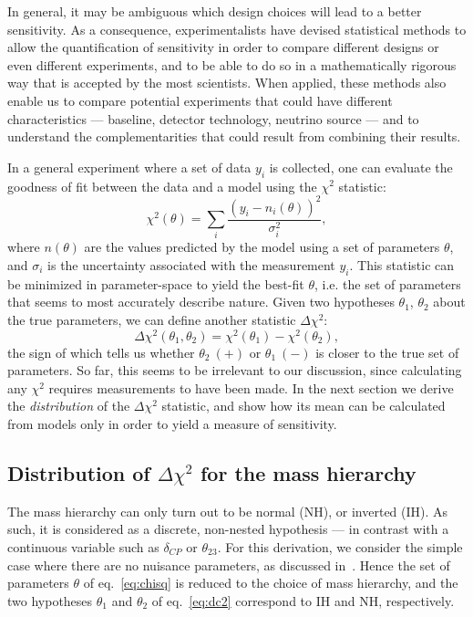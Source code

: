 In general, it may be ambiguous which design choices will lead to a better
sensitivity.  As a consequence, experimentalists have devised statistical
methods to allow the quantification of sensitivity in order to compare
different designs or even different experiments, and to be able to do so in a
mathematically rigorous way that is accepted by the most scientists.
When applied, these methods also enable us to compare potential experiments that
could have different characteristics --- baseline, detector technology,
neutrino source --- and to understand the complementarities that could result
from combining their results.

In a general experiment where a set of data $y_i$ is collected, one can
evaluate the goodness of fit between the data and a model using the
$\chi^2$ statistic:
\begin{equation}
	\chi^2(\theta) = \sum_i \frac{(y_i -
	n_i(\theta))^2}{\sigma^2_i},\label{eq:chisq}
\end{equation}
where $n(\theta)$ are the values predicted by the model using a set of parameters
$\theta$, and $\sigma_i$ is the uncertainty associated with the measurement $y_i$.
This statistic can be minimized in parameter-space to yield the best-fit
$\theta$, i.e. the set of parameters that seems to most accurately describe nature.
Given two hypotheses $\theta_1$, $\theta_2$ about the true parameters, we can define another
statistic $\Delta \chi^2$:
\begin{equation}
	\Delta \chi^2(\theta_1, \theta_2) = \chi^2(\theta_1) -
	\chi^2(\theta_2),\label{eq:dc2}
\end{equation}
the sign of which tells us whether $\theta_2~(+)$ or $\theta_1~(-)$ is closer to the
true set of parameters. So far, this seems to be irrelevant to our discussion,
since calculating any $\chi^2$ requires measurements to have been made. In the
next section we derive the \emph{distribution} of the $\Delta\chi^2$ statistic,
and show how its mean can be calculated from models only in order to yield a measure of
sensitivity.




\subsection{Distribution of $\Delta \chi^2$ for the mass hierarchy}
The mass hierarchy can only turn out to be normal (NH), or inverted (IH). As
such, it is considered as a discrete, non-nested hypothesis --- in contrast with a continuous
variable such as $\delta_{CP}$ or $\theta_{23}$. For this derivation, we consider the simple case
where there are no nuisance parameters, as discussed in~\cite{ciuffoli, qian}.
Hence the set of parameters $\theta$ of eq.~\ref{eq:chisq} is reduced to the
choice of mass hierarchy, and the two hypotheses $\theta_1$ and $\theta_2$ of
eq.~\ref{eq:dc2} correspond to IH and NH, respectively.


